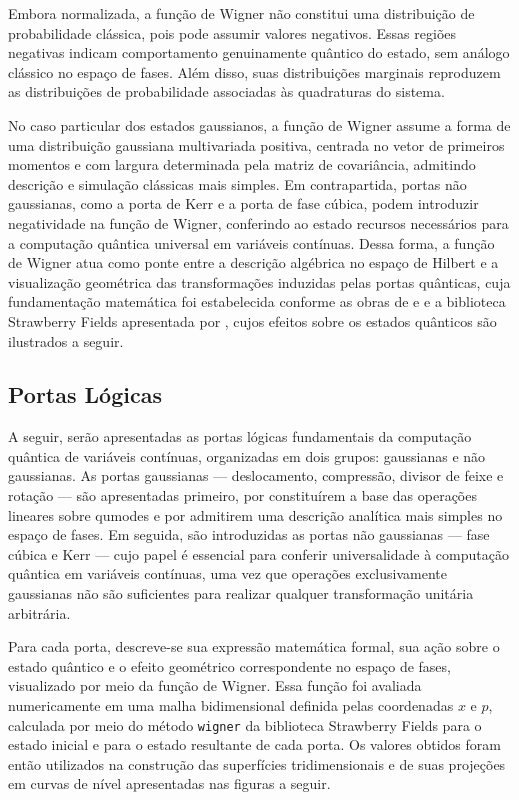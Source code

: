 Embora normalizada, a função de Wigner não constitui uma distribuição de probabilidade clássica, pois pode assumir valores negativos. Essas regiões negativas indicam comportamento genuinamente quântico do estado, sem análogo clássico no espaço de fases. Além disso, suas distribuições marginais reproduzem as distribuições de probabilidade associadas às quadraturas do sistema.

No caso particular dos estados gaussianos, a função de Wigner assume a forma de uma distribuição gaussiana multivariada positiva, centrada no vetor de primeiros momentos e com largura determinada pela matriz de covariância, admitindo descrição e simulação clássicas mais simples. Em contrapartida, portas não gaussianas, como a porta de Kerr e a porta de fase cúbica, podem introduzir negatividade na função de Wigner, conferindo ao estado recursos necessários para a computação quântica universal em variáveis contínuas. Dessa forma, a função de Wigner atua como ponte entre a descrição algébrica no espaço de Hilbert e a visualização geométrica das transformações induzidas pelas portas quânticas, cuja fundamentação matemática foi estabelecida conforme as obras de \textcite{de_lima_redes_nodate} e \textcite{serafini_quantum_2023} e a biblioteca Strawberry Fields apresentada por \textcite{killoran_strawberry_2019}, cujos efeitos sobre os estados quânticos são ilustrados a seguir.

\subsection{Portas Lógicas}\label{sec:logic_gates_continuous_variables}

A seguir, serão apresentadas as portas lógicas fundamentais da computação quântica de variáveis contínuas, organizadas em dois grupos: gaussianas e não gaussianas. As portas gaussianas — deslocamento, compressão, divisor de feixe e rotação — são apresentadas primeiro, por constituírem a base das operações lineares sobre qumodes e por admitirem uma descrição analítica mais simples no espaço de fases. Em seguida, são introduzidas as portas não gaussianas — fase cúbica e Kerr — cujo papel é essencial para conferir universalidade à computação quântica em variáveis contínuas, uma vez que operações exclusivamente gaussianas não são suficientes para realizar qualquer transformação unitária arbitrária.

Para cada porta, descreve-se sua expressão matemática formal, sua ação sobre o estado quântico e o efeito geométrico correspondente no espaço de fases, visualizado por meio da função de Wigner. Essa função foi avaliada numericamente em uma malha bidimensional definida pelas coordenadas $x$ e $p$, calculada por meio do método \texttt{wigner} da biblioteca Strawberry Fields para o estado inicial e para o estado resultante de cada porta. Os valores obtidos foram então utilizados na construção das superfícies tridimensionais e de suas projeções em curvas de nível apresentadas nas figuras a seguir.

